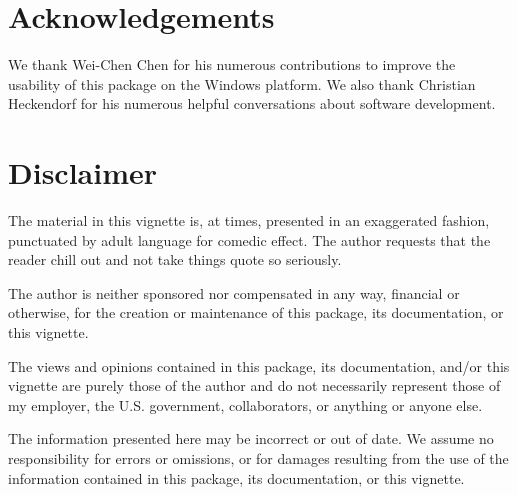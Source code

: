 \section*{Acknowledgements}

We thank Wei-Chen Chen for his numerous contributions to improve the usability of this package on the Windows platform.  We also thank Christian Heckendorf for his numerous helpful conversations about software development.


\section*{Disclaimer}

The material in this vignette is, at times, presented in an exaggerated fashion, punctuated by adult language for comedic effect.  The author requests that the reader chill out and not take things quote so seriously.  

The author is neither sponsored nor compensated in any way, financial or otherwise, for the creation or maintenance of this package, its documentation, or this vignette.  

The views and opinions contained in this package, its documentation, and/or this vignette are purely those of the author and do not necessarily represent those of my employer, the U.S. government, collaborators, or anything or anyone else.

The information presented here may be incorrect or out of date.   We assume no responsibility for errors or omissions, or for damages resulting from the use of the information contained in this package, its documentation, or this vignette.
